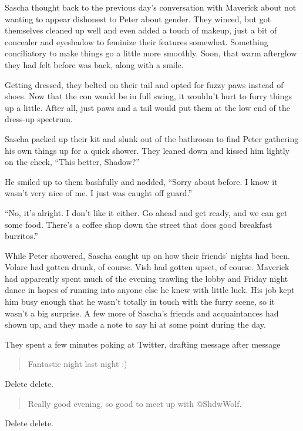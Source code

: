 \documentclass[12pt,letterpaper,oneside]{memoir}
\begin{document}
  Sascha thought back to the previous day's conversation with Maverick about not wanting to appear dishonest to Peter about gender. They winced, but got themselves cleaned up well and even added a touch of makeup, just a bit of concealer and eyeshadow to feminize their features somewhat. Something conciliatory to make things go a little more smoothly. Soon, that warm afterglow they had felt before was back, along with a smile.

  Getting dressed, they belted on their tail and opted for fuzzy paws instead of shoes. Now that the con would be in full swing, it wouldn't hurt to furry things up a little. After all, just paws and a tail would put them at the low end of the dress-up spectrum.

  Sascha packed up their kit and slunk out of the bathroom to find Peter gathering his own things up for a quick shower. They leaned down and kissed him lightly on the cheek, ``This better, Shadow?''

  He smiled up to them bashfully and nodded, ``Sorry about before. I know it wasn't very nice of me. I just was caught off guard.''

  ``No, it's alright. I don't like it either. Go ahead and get ready, and we can get some food. There's a coffee shop down the street that does good breakfast burritos.''

  While Peter showered, Sascha caught up on how their friends' nights had been. Volare had gotten drunk, of course. Vish had gotten upset, of course. Maverick had apparently spent much of the evening trawling the lobby and Friday night dance in hopes of running into anyone else he knew with little luck. His job kept him busy enough that he wasn't totally in touch with the furry scene, so it wasn't a big surprise. A few more of Sascha's friends and acquaintances had shown up, and they made a note to say hi at some point during the day.

  They spent a few minutes poking at Twitter, drafting message after message

  \begin{quote}
    Fantastic night last night :)
  \end{quote}

  Delete delete.

  \begin{quote}
    Really good evening, so good to meet up with @ShdwWolf.
  \end{quote}

  Delete delete.
\end{document}
